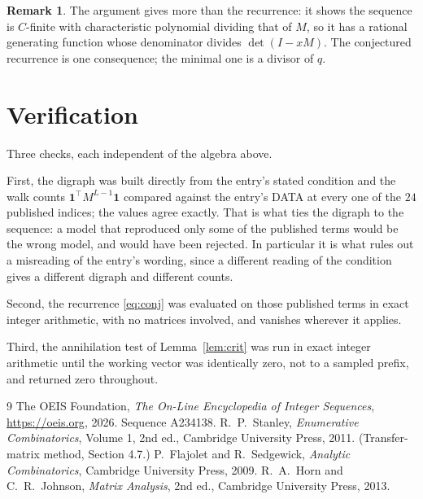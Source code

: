 \documentclass[11pt,a4paper]{article}
\theoremstyle{plain}
\theoremstyle{definition}
\newtheorem{remark}[theorem]{Remark}
\begin{document}
\begin{remark}
The argument gives more than the recurrence: it shows the sequence is $C$-finite with
characteristic polynomial dividing that of $M$, so it has a rational generating function
whose denominator divides $\det(I-xM)$. The conjectured recurrence is one consequence; the
minimal one is a divisor of $q$.
\end{remark}

\section{Verification}

Three checks, each independent of the algebra above.

First, the digraph was built directly from the entry's stated condition and the walk counts
$\mathbf{1}^{\!\top}M^{L-1}\mathbf{1}$ compared against the entry's DATA at
every one of the $24$ published indices; the values agree exactly. That is what ties
the digraph to the sequence: a model that reproduced only some of the published terms would
be the wrong model, and would have been rejected. In particular it is what rules out a
misreading of the entry's wording, since a different reading of the condition gives a
different digraph and different counts.

Second, the recurrence \eqref{eq:conj} was evaluated on those published terms in exact
integer arithmetic, with no matrices involved, and vanishes wherever it applies.

Third, the annihilation test of Lemma~\ref{lem:crit} was run in exact integer arithmetic
until the working vector was identically zero, not to a sampled prefix, and returned zero
throughout.

\begin{thebibliography}{9}
 The OEIS Foundation, \emph{The On-Line Encyclopedia of Integer
Sequences}, \url{https://oeis.org}, 2026. Sequence A234138.
 R.~P.~Stanley, \emph{Enumerative Combinatorics}, Volume 1, 2nd ed.,
Cambridge University Press, 2011. (Transfer-matrix method, Section 4.7.)
 P.~Flajolet and R.~Sedgewick, \emph{Analytic Combinatorics}, Cambridge
University Press, 2009.
 R.~A.~Horn and C.~R.~Johnson, \emph{Matrix Analysis}, 2nd ed., Cambridge
University Press, 2013.
\end{thebibliography}
\end{document}
